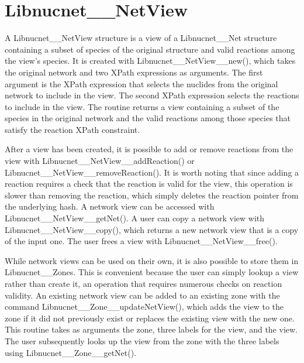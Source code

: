 \documentclass{article}    %
\begin{document}
\section{Libnucnet\_\_NetView}

A Libnucnet\_\_NetView structure is a view of a Libnucnet\_\_Net structure
containing a subset of species of the original structure and valid
reactions among the view's species.  It is created with
Libnucnet\_\_NetView\_\_new(), which takes the original network and
two XPath expressions as arguments.  The first argument is the XPath
expression that selects the nuclides from the original network to include
in the view.  The second XPath expression selects the reactions to include
in the view.  The routine returns a view containing a subset of the
species in the original network and the valid reactions among those species
that satisfy the reaction XPath constraint.

After a view has been created, it is possible to add or remove reactions
from the view with Libnucnet\_\_NetView\_\_addReaction() or
Libnucnet\_\_NetView\_\_removeReaction().  It is worth noting that
since adding a reaction
requires a check that the reaction is valid for the view, this operation
is slower than removing the reaction, which simply deletes the reaction
pointer from the underlying hash.
A network view can be accessed with
Libnucnet\_\_NetView\_\_getNet().  A user can copy a network view
with Libnucnet\_\_NetView\_\_copy(), which returns a new network
view that is a copy of the input one.  The user frees a view with
Libnucnet\_\_NetView\_\_free().

While network views can be used on their own, it is also possible to
store them in Libnucnet\_\_Zones.  This is convenient because the user
can simply lookup a view rather than create it, an operation that requires
numerous checks on reaction validity.  An existing network view can
be added to an existing zone with the command
Libnucnet\_\_Zone\_\_updateNetView(), which adds the view to the
zone if it did not previously exist or replaces the existing view with
the new one.  This routine takes as arguments the zone, three labels for
the view, and the view.  The user subsequently looks up the view from the
zone with the three labels using Libnucnet\_\_Zone\_\_getNet().
\end{document}
